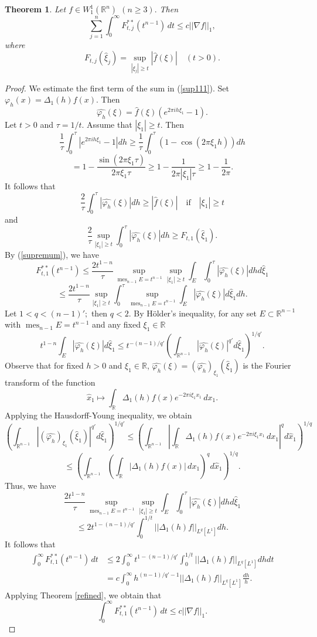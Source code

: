 \documentclass[12pt,twoside,reqno]{amsart}
\numberwithin{equation}{section}
\newtheorem{teo}{Theorem}[section]
\theoremstyle{definition}
\numberwithin{equation}{section}
\def\R{\mathbb{R}}
\def\f{\varphi}
\def\mes{\operatorname{mes}}
\begin{document}
\begin{teo}\label{Sup} Let $f\in W_1^1(\R^n)$ $(n\ge 3).$ Then
\begin{equation}\label{sup111}
\sum_{j=1}^n\int_0^\infty F_{t,j}^{**}(t^{n-1})\,dt\le c ||\nabla f||_1,
\end{equation}
where
\begin{equation}\label{sup11}
F_{t,j}(\widehat\xi_j)=\sup_{|\xi_j|\ge t}|\widehat f(\xi)|\quad (t>0).
\end{equation}
\end{teo}
\begin{proof} We estimate the first term of the sum in (\ref{sup111}). Set $\f_h(x)=\Delta_1(h)f(x).$ Then
$$
\widehat {\f_h}(\xi)=\widehat f(\xi)(e^{2\pi ih\xi_1}-1).
$$
Let $t>0$ and $\tau=1/t.$ Assume that $|\xi_1|\ge t.$ Then
$$
\frac{1}{\tau}\int_0^\tau |e^{2\pi ih\xi_1}-1|dh\ge \frac{1}{\tau}\int_0^\tau (1-\cos (2\pi \xi_1 h))dh
$$
$$
=1-\frac{\sin (2\pi\xi_1 \tau)}{2\pi\xi_1\tau}\ge 1-\frac{1}{2\pi|\xi_1|\tau}\ge 1-\frac{1}{2\pi}.
$$
It follows that
$$
\frac{2}{\tau}\int_0^\tau|\widehat {\f_h}(\xi)|dh\ge|\widehat f(\xi)|\quad\mbox{if}\quad |\xi_1|\ge t
$$
and
$$
\frac{2}{\tau}\sup_{|\xi_1|\ge t}\int_0^\tau|\widehat {\f_h}(\xi)|dh\ge F_{t,1}(\widehat\xi_1).
$$
By (\ref{supremum}), we have
$$
 F_{t,1}^{**}(t^{n-1})\le \frac{2t^{1-n}}{\tau}\sup_{\mes_{n-1}E=t^{n-1}}\sup_{|\xi_1|\ge t}\int_E\int_0^\tau|\widehat {\f_h}(\xi)|dhd\widehat\xi_1
$$
$$
\le \frac{2t^{1-n}}{\tau}\sup_{|\xi_1|\ge t}\int_0^\tau \sup_{\mes_{n-1}E=t^{n-1}}\int_E|\widehat {\f_h}(\xi)|d\widehat\xi_1dh.
$$
Let $1<q<(n-1)';$ then $q<2$. By H\"older's inequality, for any set $E\subset \R^{n-1}$ with $\mes_{n-1}E=t^{n-1}$ and any fixed $\xi_1\in \R$
$$
t^{1-n}\int_E|\widehat {\f_h}(\xi)|d\widehat\xi_1
\le t^{-(n-1)/q'}\left(\int_{\R^{n-1}}|\widehat {\f_h}(\xi)|^{q'}d\widehat\xi_1\right)^{1/q'}.
$$
Observe that for  fixed $h>0$ and  $\xi_1\in\R$, $\widehat {\f_h}(\xi)=(\widehat {\f_h})_{\xi_1}(\widehat \xi_1)$ is the Fourier transform of the function
$$
\widehat{x}_1\mapsto \int_\R \Delta_1(h)f(x)e^{-2\pi i\xi_1 x_1}\,dx_1.
$$
Applying the Hausdorff-Young inequality, we obtain
$$
\left(\int_{\R^{n-1}}|(\widehat {\f_h})_{\xi_1}(\widehat \xi_1)|^{q'}d\widehat\xi_1\right)^{1/q'}\le \left(\int_{\R^{n-1}}
\left|\int_\R \Delta_1(h)f(x)e^{-2\pi i\xi_1 x_1}\,dx_1\right|^q d\widehat x_1\right)^{1/q}
$$
$$
\le \left(\int_{\R^{n-1}}
\left(\int_\R |\Delta_1(h)f(x)|\,dx_1\right)^qd\widehat x_1\right)^{1/q}.
$$
Thus,
we have
$$
\frac{2t^{1-n}}{\tau}\sup_{\mes_{n-1}E=t^{n-1}}\sup_{|\xi_1|\ge t}\int_E\int_0^\tau|\widehat {\f_h}(\xi)|dhd\widehat\xi_1
$$
$$
\le 2t^{1-(n-1)/q'}\int_0^{1/t}||\Delta_1(h)f||_{L^q[L^1]}dh.
$$
It follows that
$$
\begin{aligned}
\int_0^\infty  F_{t,1}^{**}(t^{n-1})\,dt
&\le 2\int_0^\infty t^{1-(n-1)/q'}\int_0^{1/t}||\Delta_1(h)f||_{L^q[L^1]}dhdt\\
&= c \int_0^\infty h^{(n-1)/q'-1}||\Delta_1(h)f||_{L^q[L^1]}\frac{dh}{h}.
\end{aligned}
$$
Applying Theorem \ref{refined}, we obtain that
$$
\int_0^\infty  F_{t,1}^{**}(t^{n-1})\,dt\le c ||\nabla f||_1.
$$
\end{proof}
\end{document}
